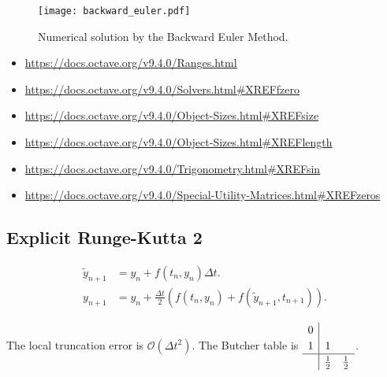 \begin{figure}[ht!]
	\centering
	\texttt{[image: backward\_euler.pdf]}
	\caption{Numerical solution by the Backward Euler Method.}
\end{figure}

\begin{itemize}
	\item

	      \url{https://docs.octave.org/v9.4.0/Ranges.html}

	\item

	      \url{https://docs.octave.org/v9.4.0/Solvers.html#XREFfzero}

	\item

	      \url{https://docs.octave.org/v9.4.0/Object-Sizes.html#XREFsize}

	\item

	      \url{https://docs.octave.org/v9.4.0/Object-Sizes.html#XREFlength}

	\item

	      \url{https://docs.octave.org/v9.4.0/Trigonometry.html#XREFsin}

	\item

	      \url{https://docs.octave.org/v9.4.0/Special-Utility-Matrices.html#XREFzeros}
\end{itemize}


\subsection{Explicit Runge-Kutta 2}
\begin{align*}
	\widetilde{y}_{n+1} & =
	y_{n}+
	f\left(t_{n},y_{n}\right)\Delta t. \\
	y_{n+1}             & =
	y_{n}+
	\frac{\Delta t}{2}
	\left(
	f\left(t_{n},y_{n}\right)+
	f\left(\widetilde{y}_{n+1},t_{n+1}\right)
	\right).
\end{align*}

The local truncation error is
\begin{math}
	\mathcal{O}
	\left(\Delta t^{2}\right)
\end{math}.
The Butcher table is
\begin{math}
	\renewcommand\arraystretch{1.2}
	\begin{array}
		{c|cc}
		0 &             &             \\
		1 & 1           &             \\
		\hline
		  & \frac{1}{2} & \frac{1}{2}
	\end{array}
\end{math}.

